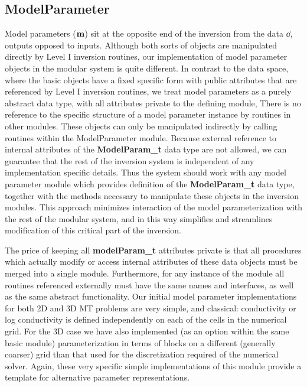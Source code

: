 \subsection{ModelParameter}

Model parameters (${\bf m}$) sit at the opposite end of the inversion
from the data $\dd$, outputs opposed to inputs.  
Although both sorts of objects
are manipulated directly by Level I inversion routines,
our implementation of model parameter
objects in the modular system is quite different.
In contrast to the data space, where the basic objects
have a fixed specific form with public attributes
that are referenced by Level I inversion routines,
we treat model parameters as a purely abstract data type,
with all attributes private to the defining module,
There is no reference to the specific structure of a
model parameter instance
by routines in other modules.  
These objects can only be manipulated indirectly
by calling routines within the ModelParameter module.
Because external reference to internal
attributes of the {\bf ModelParam\_t} data type are not allowed,
we can guarantee that the rest of the inversion system
is independent of any implementation specific details.
Thus the system should work with any model parameter
module which provides definition of the {\bf ModelParam\_t} data type,
together with the methods necessary to manipulate these
objects in the inversion modules.
This approach minimizes
interaction of the model parameterization with the rest
of the modular system, and in this way simplifies
and streamlines modification of this critical part of the inversion.

The price of keeping all {\bf modelParam\_t} attributes private
is that all procedures which actually modify or access
internal attributes of these data objects
must be merged into a single module.
Furthermore, for any instance of the module
all routines referenced externally must have the same names
and interfaces, as well as the same abstract functionality.
Our initial model parameter implementations
for both 2D and 3D MT problems
are very simple, and classical:
conductivity or log conductivity is defined independently on 
each of the cells in the numerical grid.
For the 3D case we have also implemented (as an option
within the same basic module) parameterization in terms
of blocks on a different (generally coarser) grid
than that used for the discretization required of the
numerical solver.
Again, these very specific simple implementations of
this module provide a template for alternative parameter
representations.

